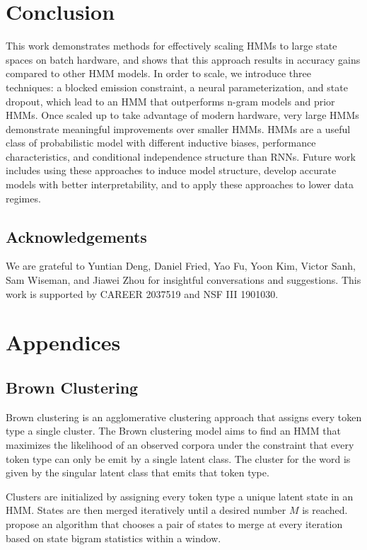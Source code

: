 \documentclass[11pt,a4paper]{article}
\begin{document}
\section{Conclusion}
This work demonstrates methods for effectively scaling HMMs to large state spaces on batch 
hardware, and shows that this approach results in accuracy gains compared to other HMM models.
In order to scale, we introduce three techniques:
a blocked emission constraint, a neural parameterization,
and state dropout, which lead to an HMM that outperforms n-gram models and prior HMMs.
Once scaled up to take advantage of modern hardware,
very large HMMs demonstrate meaningful improvements over smaller HMMs.
HMMs are a useful class of probabilistic model with different inductive biases, 
performance characteristics, and conditional independence structure than RNNs. 
Future work includes using these approaches to induce model structure, develop accurate models 
with better interpretability, and to apply these approaches to lower data regimes. 


\subsection*{Acknowledgements}
We are grateful to
Yuntian Deng, Daniel Fried, Yao Fu, Yoon Kim, Victor Sanh, Sam Wiseman, and Jiawei Zhou
for insightful conversations and suggestions.  This work is supported by CAREER 2037519 and NSF III 1901030.





\appendix

\section{Appendices}

\subsection{Brown Clustering}
Brown clustering is an agglomerative clustering approach \citep{brown1992,liang2005brown} that assigns every token type a single cluster.
The Brown clustering model aims to find an HMM that maximizes the likelihood of an observed corpora under the constraint that every token type can only be emit by a single latent class. The cluster for the word is given by the singular latent class that emits that token type.

Clusters are initialized by assigning every token type a unique latent state in an HMM. States are then merged iteratively until a desired number $M$ is reached. \citet{liang2005brown} propose an algorithm that chooses a pair of states to merge at every iteration based on state bigram statistics within a window.
\end{document}
